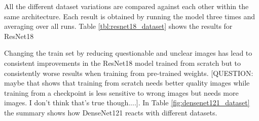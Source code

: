 All the different dataset variations are compared against each other within the same architecture. Each result is obtained by running the model three times and averaging over all runs. Table \ref{tbl:resnet18_dataset} shows the results for ResNet18

\begin{table}[h] \centering
{}
\caption{Dataset variations with ResNet18. The first group shows how the datasets performed when trained from scratch whereas the second group shows how the datasets performed with pre-training.}
\label{tbl:resnet18_dataset}
\end{table}

Changing the train set by reducing questionable and unclear images has lead to consistent improvements in the ResNet18 model trained from scratch but to consistently worse results when training from pre-trained weights. [QUESTION: maybe that shows that training from scratch needs better quality images while training from a checkpoint is less sensitive to wrong images but needs more images. I don't think that's true though....]. In Table \ref{fig:densenet121_dataset} the summary shows how DenseNet121 reacts with different datasets.

